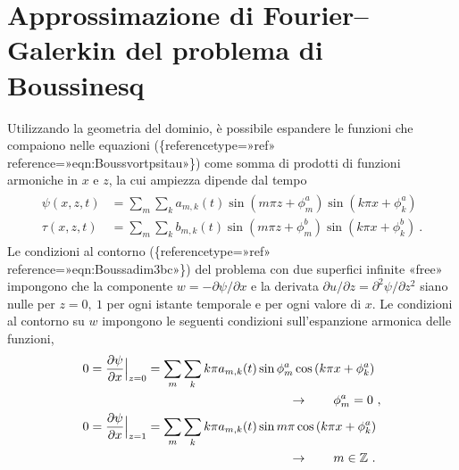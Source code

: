\documentclass[letterpaper,10pt,italian]{jupyterBook}
\begin{document}
\section{Approssimazione di Fourier–Galerkin del problema di Boussinesq}
\label{\detokenize{polimi/fluidmechanics-ita/template/capitoli/07_similitudine/07teoria:approssimazione-di-fourier-galerkin-del-problema-di-boussinesq}}
\sphinxAtStartPar
Utilizzando la geometria del dominio, è possibile espandere le funzioni
che compaiono nelle equazioni
(\{reference\sphinxhyphen{}type=»ref»
reference=»eqn:Bouss\sphinxhyphen{}vort\sphinxhyphen{}psi\sphinxhyphen{}tau»\}) come somma di prodotti di funzioni
armoniche in \(x\) e \(z\), la cui ampiezza dipende dal tempo
\begin{equation*}
\begin{split}\label{eqn:harm-1}
\begin{aligned}
    \psi(x,z,t) & = \sum_m \sum_k a_{m,k}(t) \sin{(m\pi z + \phi^a_m)}\sin{(k\pi x + \phi^a_k)} \\
    \tau(x,z,t) & = \sum_m \sum_k b_{m,k}(t) \sin{(m\pi z + \phi^b_m)}\sin{(k\pi x + \phi^b_k)} \ .
\end{aligned}\end{split}
\end{equation*}
\sphinxAtStartPar
Le condizioni al contorno
(\{reference\sphinxhyphen{}type=»ref»
reference=»eqn:Bouss\sphinxhyphen{}adim\sphinxhyphen{}3\sphinxhyphen{}bc»\}) del problema con due superfici
infinite «free» impongono che la componente
\(w=-\partial{\psi}/\partial{x}\) e la derivata
\(\partial u/\partial z = \partial^2 \psi/\partial z^2\) siano nulle per
\(z = 0, \ 1\) per ogni istante temporale e per ogni valore di \(x\). Le
condizioni al contorno su \(w\) impongono le seguenti condizioni
sull’espanzione armonica delle funzioni,
\begin{equation*}
\begin{split}\begin{aligned}
      0 = \dfrac{\partial \psi}{\partial x}\Big|_{z=0} & = \sum_m \sum_k k \pi a_{m,k}(t) \sin{ \phi^a_m }\cos{(k\pi x + \phi^a_k)} \\
      & \hspace{4.0cm} \rightarrow \qquad \phi^a_m = 0 \ , \\
      0 = \dfrac{\partial \psi}{\partial x}\Big|_{z=1} & = \sum_m \sum_k k \pi a_{m,k}(t) \sin{ m \pi }\cos{(k\pi x + \phi^a_k)} \\
      & \hspace{4.0cm} \rightarrow \qquad m \in \mathbb{Z} \ .
\end{aligned}\end{split}
\end{equation*}
\end{document}
